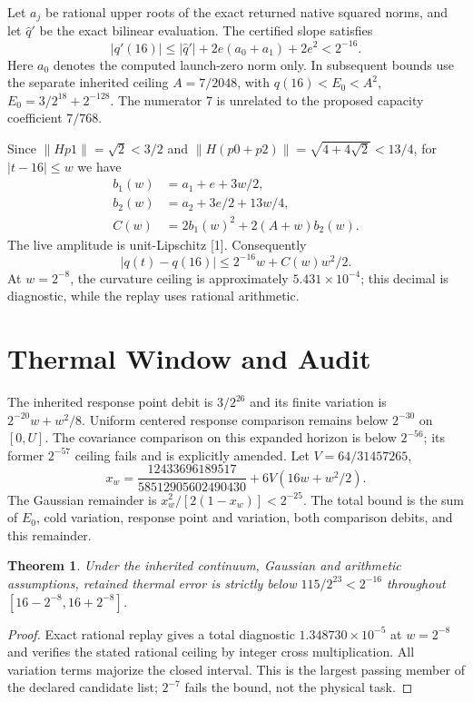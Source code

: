 \documentclass[a4paper,journal]{IEEEtran}
\newtheorem{theorem}{Theorem}
\begin{document}
Let $a_j$ be rational upper roots of the exact returned native squared norms, and let $\widehat q'$ be the exact bilinear evaluation. The certified slope satisfies
\begin{equation}
 |q'(16)|\le |\widehat q'|+2e(a_0+a_1)+2e^2<2^{-16}.
\end{equation}
Here $a_0$ denotes the computed launch-zero norm only. In subsequent bounds use the separate inherited ceiling $A=7/2048$, with $q(16)<E_0<A^2$, $E_0=3/2^{18}+2^{-128}$. The numerator 7 is unrelated to the proposed capacity coefficient $7/768$.

Since $\|Hp1\|=\sqrt2<3/2$ and $\|H(p0+p2)\|=\sqrt{4+4\sqrt2}<13/4$, for $|t-16|\le w$ we have
\begin{align}
 b_1(w)&=a_1+e+3w/2,\\
 b_2(w)&=a_2+3e/2+13w/4,\\
 C(w)&=2b_1(w)^2+2(A+w)b_2(w).
\end{align}
The live amplitude is unit-Lipschitz [1]. Consequently
\begin{equation}
 |q(t)-q(16)|\le2^{-16}w+C(w)w^2/2.
\end{equation}
At $w=2^{-8}$, the curvature ceiling is approximately $5.431\times10^{-4}$; this decimal is diagnostic, while the replay uses rational arithmetic.
\section{Thermal Window and Audit}
The inherited response point debit is $3/2^{26}$ and its finite variation is $2^{-20}w+w^2/8$. Uniform centered response comparison remains below $2^{-30}$ on $[0,U]$. The covariance comparison on this expanded horizon is below $2^{-56}$; its former $2^{-57}$ ceiling fails and is explicitly amended. Let $V=64/31457265$,
\begin{equation}
 x_w=\frac{12433696189517}{58512905602490430}
       +6V(16w+w^2/2).
\end{equation}
The Gaussian remainder is $x_w^2/[2(1-x_w)]<2^{-25}$. The total bound is the sum of $E_0$, cold variation, response point and variation, both comparison debits, and this remainder.
\begin{theorem}
Under the inherited continuum, Gaussian and arithmetic assumptions, retained thermal error is strictly below $115/2^{23}<2^{-16}$ throughout $[16-2^{-8},16+2^{-8}]$.
\end{theorem}
\begin{proof}
Exact rational replay gives a total diagnostic $1.348730\times10^{-5}$ at $w=2^{-8}$ and verifies the stated rational ceiling by integer cross multiplication. All variation terms majorize the closed interval. This is the largest passing member of the declared candidate list; $2^{-7}$ fails the bound, not the physical task.
\end{proof}
\end{document}
